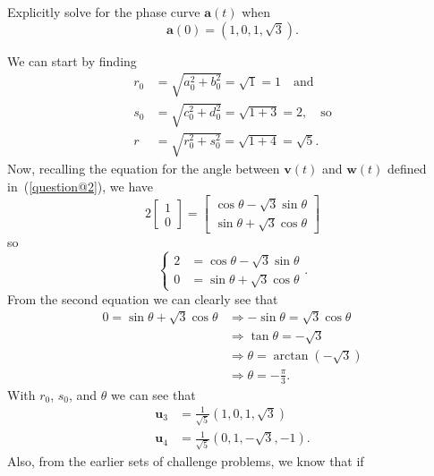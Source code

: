 \documentclass{exam}
\begin{document}
\begin{questions}
    \question Explicitly solve for the phase curve $\mathbf{a}(t)$ when 
    \[
        \mathbf{a}(0) = (1, 0, 1, \sqrt{3}).
    \]
    \begin{solution}
        We can start by finding 
        \begin{align*}
            r_0 &= \sqrt{a_0^2 + b_0^2} = \sqrt{1} = 1 \quad\text{and} \\
            s_0 &= \sqrt{c_0^2 + d_0^2} = \sqrt{1 + 3} = 2, \quad\text{so} \\
            r &= \sqrt{r_0^2 + s_0^2} = \sqrt{1 + 4} = \sqrt{5}.
        \end{align*}
        Now, recalling the equation for the angle between $\mathbf{v}(t)$ and $\mathbf{w}(t)$ defined in~(\ref{question@2}), we have 
        \[
            2\begin{bmatrix}
                1 \\ 0
            \end{bmatrix} 
            = 
            \begin{bmatrix}
                \cos\theta - \sqrt{3}\sin\theta \\
                \sin\theta + \sqrt{3}\cos\theta
            \end{bmatrix}
        \]
        so 
        \[
            \begin{cases}
                2 &= \cos\theta - \sqrt{3}\sin\theta \\
                0 &= \sin\theta + \sqrt{3}\cos\theta
            \end{cases}.
        \]
        From the second equation we can clearly see that 
        \begin{align*}
            0 = \sin\theta + \sqrt{3}\cos\theta &\Rightarrow -\sin\theta = \sqrt{3}\cos\theta \\
            &\Rightarrow \tan\theta = -\sqrt{3} \\
            &\Rightarrow \theta = \arctan(-\sqrt{3}) \\
            &\Rightarrow \theta = -\frac{\pi}{3}.
        \end{align*}
        With $r_0$, $s_0$, and $\theta$ we can see that 
        \begin{align*}
            \mathbf{u}_3 &= \frac{1}{\sqrt{5}}(1, 0, 1, \sqrt{3}) \\
            \mathbf{u}_4 &= \frac{1}{\sqrt{5}}(0, 1, -\sqrt{3}, -1).
        \end{align*}
        Also, from the earlier sets of challenge problems, we know that if 
        \[
\]
\end{solution}
\end{questions}
\end{document}
